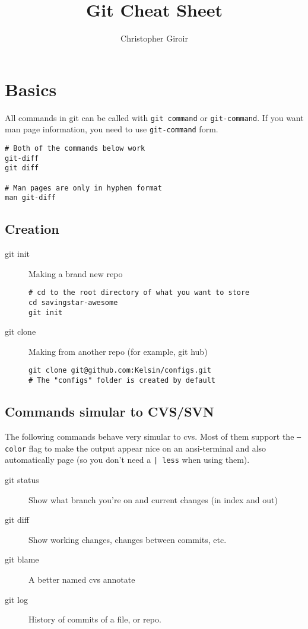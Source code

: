 \documentclass[letterpaper,12pt]{article}
\title{Git Cheat Sheet}
\author{Christopher Giroir}
\begin{document}
\maketitle

\section{Basics}

All commands in git can be called with \texttt{git command} or
\texttt{git-command}. If you want man page information, you need to use
\texttt{git-command} form.

\begin{verbatim}
# Both of the commands below work
git-diff
git diff

# Man pages are only in hyphen format
man git-diff
\end{verbatim}

\subsection{Creation}

\begin{description}
\item [git init] Making a brand new repo

\begin{verbatim}
# cd to the root directory of what you want to store
cd savingstar-awesome
git init
\end{verbatim}

\item [git clone] Making from another repo (for example, git hub)

\begin{verbatim}
git clone git@github.com:Kelsin/configs.git
# The "configs" folder is created by default
\end{verbatim}

\end{description}

\subsection{Commands simular to CVS/SVN}

The following commands behave very simular to cvs. Most of them support the
\texttt{--color} flag to make the output appear nice on an ansi-terminal and
also automatically page (so you don't need a \texttt{| less} when using them).

\begin{description}
\item [git status] Show what branch you're on and current changes (in index and out)
\item [git diff] Show working changes, changes between commits, etc.
\item [git blame] A better named cvs annotate
\item [git log] History of commits of a file, or repo.
\end{description}
\end{document}
